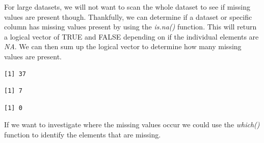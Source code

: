 \documentclass[
  letterpaper,
  DIV=11,
  numbers=noendperiod]{scrreprt}
\newenvironment{Shaded}{\begin{snugshade}}{\end{snugshade}}
\newcommand{\DecValTok}[1]{\textcolor[rgb]{0.68,0.00,0.00}{#1}}
\newcommand{\FunctionTok}[1]{\textcolor[rgb]{0.28,0.35,0.67}{#1}}
\newcommand{\NormalTok}[1]{\textcolor[rgb]{0.00,0.23,0.31}{#1}}
\newcommand{\SpecialCharTok}[1]{\textcolor[rgb]{0.37,0.37,0.37}{#1}}
\begin{document}
For large datasets, we will not want to scan the whole dataset to see if
missing values are present though. Thankfully, we can determine if a
dataset or specific column has missing values present by using the
\emph{is.na()} function. This will return a logical vector of TRUE and
FALSE depending on if the individual elements are \emph{NA}. We can then
sum up the logical vector to determine how many missing values are
present.

\begin{Shaded}
\end{Shaded}

\begin{verbatim}
[1] 37
\end{verbatim}

\begin{Shaded}
\end{Shaded}

\begin{verbatim}
[1] 7
\end{verbatim}

\begin{Shaded}
\end{Shaded}

\begin{verbatim}
[1] 0
\end{verbatim}

If we want to investigate where the missing values occur we could use
the \emph{which()} function to identify the elements that are missing.

\begin{Shaded}
\end{Shaded}
\end{document}
